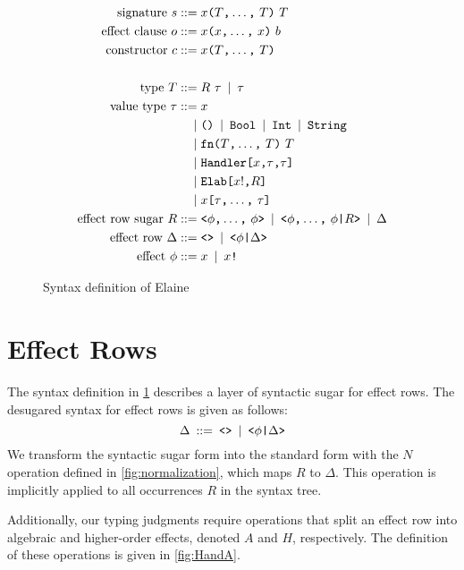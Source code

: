 \begin{figure}[p]
\begin{align*}
    \text{signature}\ s
        \IS & x \tok{(} \csep{T} \tok{)}\ T\\
    \text{effect clause}\ o
        \IS & x \tok{(} \csep{x} \tok{)}\ b\\
    \text{constructor}\ c
        \IS & x \tok{(} \csep{T} \tok{)}\\
    \\
    \text{type}\ T
        \IS & R\ \tau \OR \tau\\
    \text{value type}\ \tau
        \IS & x \\ 
        \OR & \tok{()} \OR \tok{Bool} \OR \tok{Int} \OR \tok{String}\\
        \OR & \tok{fn} \tok{(} \csep{T} \tok{)}\ T \\
        \OR & \tok{Handler}\tok{[}x\tok{,}\tau\tok{,}\tau\tok{]} \\
        \OR & \tok{Elab}\tok{[}x!\tok{,}R\tok{]} \\
        \OR & x\tok{[}\csep{\tau}\tok{]} \\
    \text{effect row sugar}\ R
        \IS & \tok{<} \csep{\phi} \tok{>}
        \OR \tok{<} \csep{\phi} \tok{|} R \tok{>}
        \OR \Delta \\
    \text{effect row}\ \Delta
        \IS & \tok{<>} \OR \tok{<}\phi\tok{|}\Delta\tok{>}\\
    \text{effect}\ \phi \IS & x \OR x\tok{!}
\end{align*}
\caption{Syntax definition of Elaine}
\label{fig:syntax}
\end{figure}

\section{Effect Rows}\label{sec:effectrows}

The syntax definition in \cref{fig:syntax} describes a layer of syntactic sugar for effect rows. The desugared syntax for effect rows is given as follows:
\[
\Delta \IS \tok{<>} \OR \tok{<}\phi\tok{|}\Delta\tok{>}
\]
We transform the syntactic sugar form into the standard form with the $N$ operation defined in \cref{fig:normalization}, which maps $R$ to $\Delta$. This operation is implicitly applied to all occurrences $R$ in the syntax tree.

Additionally, our typing judgments require operations that split an effect row into algebraic and higher-order effects, denoted $A$ and $H$, respectively. The definition of these operations is given in \cref{fig:HandA}.

